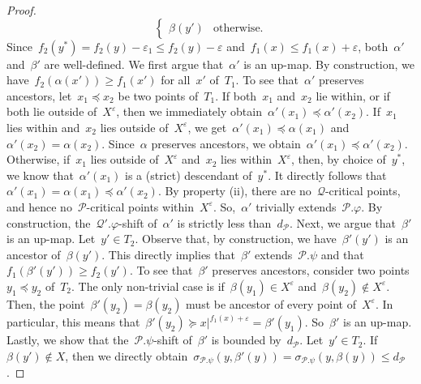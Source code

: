 \documentclass[11pt]{article}
\newcommand{\an}[2]{#1|^{#2}}
\newcommand{\shift}[1]{\sigma_{#1}}
\newcommand{\resdist}[1]{d_{#1}}
\newcommand{\eps}{\varepsilon}
\renewcommand{\phi}{\varphi}
\renewcommand{\P}{\mathcal{P}}
\newcommand{\Q}{\mathcal{Q}}
\begin{document}
\begin{proof}
\[\begin{cases}
            \beta(y') & \text{otherwise.}
        \end{cases}
    \]
    Since~$f_2(y^*) = f_2(y) - \eps_1 \le f_2(y) - \eps$ and~$f_1(x) \le f_1(x) + \eps$, both~$\alpha'$ and~$\beta'$ are well-defined.
%
%
    We first argue that~$\alpha'$ is an up-map.
    By construction, we have~$f_2(\alpha(x')) \ge f_1(x')$ for all~$x'$ of~$T_1$.
    To see that~$\alpha'$ preserves ancestors, let~$x_1 \preceq x_2$ be two points of~$T_1$.
    If both~$x_1$ and~$x_2$ lie within, or if both lie outside of~$X^\eps$, then we immediately obtain~$\alpha'(x_1) \preceq \alpha'(x_2)$.
    If~$x_1$ lies within and~$x_2$ lies outside of~$X^\eps$, we get~$\alpha'(x_1) \preceq \alpha(x_1)$ and~$\alpha'(x_2) = \alpha(x_2)$.
    Since~$\alpha$ preserves ancestors, we obtain~$\alpha'(x_1) \preceq \alpha'(x_2)$.
    Otherwise, if~$x_1$ lies outside of~$X^\eps$ and~$x_2$ lies within~$X^\eps$, then, by choice of~$y^*$, we know that~$\alpha'(x_1)$ is a (strict) descendant of~$y^*$.
    It directly follows that~$\alpha'(x_1) = \alpha(x_1) \preceq \alpha'(x_2)$.
    By property (ii), there are no~$\Q$-critical points, and hence no~$\P$-critical points within~$X^\eps$.
    So,~$\alpha'$ trivially extends~$\P.\phi$.
    By construction, the~$\Q'.\phi$-shift of~$\alpha'$ is strictly less than~$\resdist{\P}$.
%
    Next, we argue that~$\beta'$ is an up-map.
    Let~$y' \in T_2$.
    Observe that, by construction, we have~$\beta'(y')$ is an ancestor of~$\beta(y')$.
    This directly implies that~$\beta'$ extends~$\P.\psi$ and that~$f_1(\beta'(y')) \ge f_2(y')$.
    To see that~$\beta'$ preserves ancestors, consider two points~$y_1 \preceq y_2$ of~$T_2$.
    The only non-trivial case is if~$\beta(y_1) \in X^\eps$ and~$\beta(y_2) \notin X^\eps$.
    Then, the point~$\beta'(y_2) = \beta(y_2)$ must be ancestor of every point of~$X^\eps$.
    In particular, this means that~$\beta'(y_2) \succeq \an{x}{f_1(x)+\eps} = \beta'(y_1)$.
    So~$\beta'$ is an up-map.
    Lastly, we show that the~$\P.\psi$-shift of~$\beta'$ is bounded by~$\resdist{\P}$.
    Let~$y' \in T_2$.
    If~$\beta(y') \notin X$, then we directly obtain~$\shift{\P.\psi}(y, \beta'(y)) = \shift{\P.\psi}(y, \beta(y)) \le \resdist{\P}$. 

\end{proof}
\end{document}

